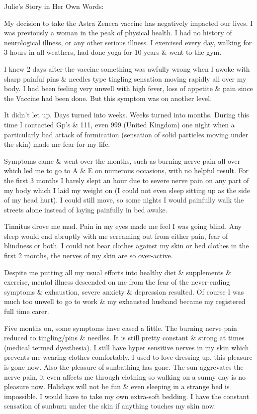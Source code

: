 Julie’s Story in Her Own Words:

My decision to take the Astra Zeneca vaccine has negatively impacted our
lives. I was previously a woman in the peak of physical health. I had no history
of neurological illness, or any other serious illness. I exercised every day,
walking for 3 hours in all weathers, had done yoga for 10 years \& went to the
gym.

I knew 2 days after the vaccine something was awfully wrong when I awoke with
sharp painful pins \& needles type tingling sensation moving rapidly all over my
body. I had been feeling very unwell with high fever, loss of appetite \& pain
since the Vaccine had been done. But this symptom was on another level.

It didn’t let up. Days turned into weeks. Weeks turned into months. During this
time I contacted Gp’s \& 111, even 999 (United Kingdom) one night when a
particularly bad attack of formication (sensation of solid particles moving
under the skin) made me fear for my life.

Symptoms came \& went over the months, such as burning nerve pain all over which
led me to go to A \& E on numerous occasions, with no helpful result. For the
first 3 months I barely slept an hour due to severe nerve pain on any part of my
body which I laid my weight on (I could not even sleep sitting up as the side of
my head hurt). I could still move, so some nights I would painfully walk the
streets alone instead of laying painfully in bed awake.

Tinnitus drove me mad. Pain in my eyes made me feel I was going blind. Any sleep
would end abruptly with me screaming out from either pain, fear of blindness or
both. I could not bear clothes against my skin or bed clothes in the first 2
months, the nerves of my skin are so over-active.

Despite me putting all my usual efforts into healthy diet \& supplements \&
exercise, mental illness descended on me from the fear of the never-ending
symptoms \& exhaustion, severe anxiety \& depression resulted. Of course I was
much too unwell to go to work \& my exhausted husband became my registered full
time carer.

Five months on, some symptoms have eased a little. The burning nerve pain
reduced to tingling/pins \& needles. It is still pretty constant \& strong at
times (medical termed dyesthesia). I still have hyper sensitive nerves in my
skin which prevents me wearing clothes comfortably. I used to love dressing up,
this pleasure is gone now. Also the pleasure of sunbathing has gone. The sun
aggrevates the nerve pain, it even affects me through clothing so walking on a
sunny day is no pleasure now. Holidays will not be fun \& even sleeping in a
strange bed is impossible. I would have to take my own extra-soft bedding. I
have the constant sensation of sunburn under the skin if anything touches my
skin now.

